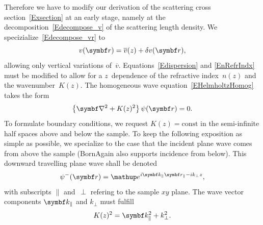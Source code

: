 Therefore we have to modify our derivation of
the scattering cross section~\cref{Exsection} at an early stage,
namely at the decomposition~\cref{Edecompose_v} of the scattering length density.
%
We specizialize~\cref{Edecompose_vr} to
\begin{equation}\label{Edecompose_vz}
  v(\r) = \overline{v}(z) + \delta v(\r),
\end{equation}
allowing only vertical variations of~$\overline{v}$.
Equations~\cref{Edispersion} and \cref{EnRefrIndx} must be modified
to allow for a $z$~dependence of the refractive index~$n(z)$ and the wavenumber~$K(z)$.
The homogeneous wave equation~\cref{EHelmholtzHomog} takes the form
\begin{equation}\label{EWaveZ}
  \left\{\Nabla^2+K(z)^2\right\}\psi(\r) = 0.
\end{equation}
To formulate boundary conditions,
%
we request $K(z)=\text{const}$ in the semi-infinite half spaces above and below the sample.
To keep the following exposition as simple as possible,
we specialize to the case that the incident plane wave comes from above the sample
(BornAgain also supports incidence from below).
This downward travelling plane wave shall be denoted
%
%
\begin{equation}\label{Epsiminus}
  \psi^{-}(\r) = \e^{i\k_\parallel\r_\parallel-ik_{\perp}z},
\end{equation}
%
%
%
%
with subscripts $\parallel$ and~$\perp$ refering to the sample $xy$ plane.
The wave vector components $\k_\parallel$ and $k_{\perp}$ must fulfill
\begin{equation}
  K(z)^2=\k_\parallel^2+k_{\perp}^2.
\end{equation}

